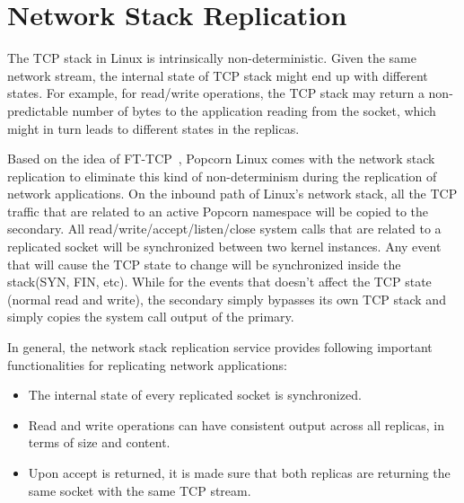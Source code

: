 \section{Network Stack Replication}
The TCP stack in Linux is intrinsically non-deterministic. Given the same network stream, the internal state of TCP stack might end up with different states. For example, for read/write operations, the TCP stack may return a non-predictable number of bytes to the application reading from the socket, which might in turn leads to different states in the replicas.

Based on the idea of FT-TCP~\cite{zagorodnov2009practical}, Popcorn Linux comes with the network stack replication to eliminate this kind of non-determinism during the replication of network applications. On the inbound path of Linux's network stack, all the TCP traffic that are related to an active Popcorn namespace will be copied to the secondary. All read/write/accept/listen/close system calls that are related to a replicated socket will be synchronized between two kernel instances. Any event that will cause the TCP state to change will be synchronized inside the stack(SYN, FIN, etc). While for the events that doesn't affect the TCP state (normal read and write), the secondary simply bypasses its own TCP stack and simply copies the system call output of the primary.

In general, the network stack replication service provides following important functionalities for replicating network applications:
\begin{itemize}
\item The internal state of every replicated socket is synchronized.
\item Read and write operations can have consistent output across all replicas, in terms of size and content.
\item Upon accept is returned, it is made sure that both replicas are returning the same socket with the same TCP stream.
\end{itemize}